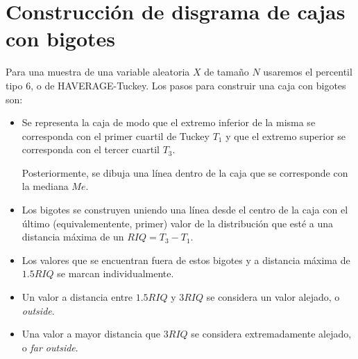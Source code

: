
\section{Construcción de disgrama de cajas con bigotes}
\noindent
Para una muestra de una variable aleatoria $X$ de tamaño $N$ usaremos el percentil tipo 6, o de HAVERAGE-Tuckey. Los pasos para construir una caja con bigotes son:
\begin{itemize}
    \item Se representa la caja de modo que el extremo inferior de la misma se corresponda con el primer cuartil de Tuckey $T_1$ y que el extremo superior se corresponda con el tercer cuartil $T_3$.

        Posteriormente, se dibuja una línea dentro de la caja que se corresponde con la mediana $Me$.
    \item Los bigotes se construyen uniendo una línea desde el centro de la caja con el último (equivalementente, primer) valor de la distribución que esté a una distancia máxima de un $RIQ = T_3 - T_1$.
    \item Los valores que se encuentran fuera de estos bigotes y a distancia máxima de $1.5 RIQ$ se marcan individualmente.
    \item Un valor a distancia entre $1.5RIQ$ y $3RIQ$ se considera un valor alejado, o \textit{outside}.
    \item Una valor a mayor distancia que $3RIQ$ se considera extremadamente alejado, o \textit{far outside}.
\end{itemize}

